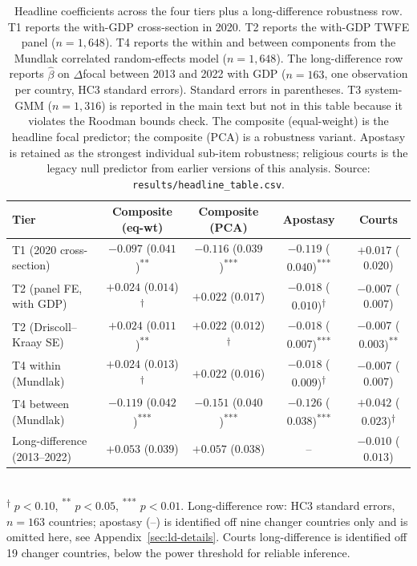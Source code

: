 \documentclass[12pt,a4paper]{article}
\begin{document}
\begin{table}[H]
\centering
\caption{Headline coefficients across the four tiers plus a long-difference robustness row. T1 reports the with-GDP cross-section in 2020. T2 reports the with-GDP TWFE panel ($n = 1{,}648$). T4 reports the within and between components from the Mundlak correlated random-effects model ($n = 1{,}648$). The long-difference row reports $\hat\beta$ on $\Delta$focal between 2013 and 2022 with GDP ($n = 163$, one observation per country, HC3 standard errors). Standard errors in parentheses. T3 system-GMM ($n = 1{,}316$) is reported in the main text but not in this table because it violates the Roodman bounds check. The composite (equal-weight) is the headline focal predictor; the composite (PCA) is a robustness variant. Apostasy is retained as the strongest individual sub-item robustness; religious courts is the legacy null predictor from earlier versions of this analysis. Source: \texttt{results/headline\_table.csv}.}
\label{tab:headline}
\begin{tabular}{lcccc}
\toprule
Tier & Composite (eq-wt) & Composite (PCA) & Apostasy & Courts \\
\midrule
T1 (2020 cross-section) & $-0.097$ ($0.041$)\textsuperscript{**} & $-0.116$ ($0.039$)\textsuperscript{***} & $-0.119$ ($0.040$)\textsuperscript{***} & $+0.017$ ($0.020$) \\
T2 (panel FE, with GDP) & $+0.024$ ($0.014$)\textsuperscript{$\dagger$} & $+0.022$ ($0.017$) & $-0.018$ ($0.010$)\textsuperscript{$\dagger$} & $-0.007$ ($0.007$) \\
T2 (Driscoll--Kraay SE) & $+0.024$ ($0.011$)\textsuperscript{**} & $+0.022$ ($0.012$)\textsuperscript{$\dagger$} & $-0.018$ ($0.007$)\textsuperscript{***} & $-0.007$ ($0.003$)\textsuperscript{**} \\
T4 within (Mundlak) & $+0.024$ ($0.013$)\textsuperscript{$\dagger$} & $+0.022$ ($0.016$) & $-0.018$ ($0.009$)\textsuperscript{$\dagger$} & $-0.007$ ($0.007$) \\
T4 between (Mundlak) & $-0.119$ ($0.042$)\textsuperscript{***} & $-0.151$ ($0.040$)\textsuperscript{***} & $-0.126$ ($0.038$)\textsuperscript{***} & $+0.042$ ($0.023$)\textsuperscript{$\dagger$} \\
\midrule
Long-difference (2013--2022) & $+0.053$ ($0.039$) & $+0.057$ ($0.038$) & -- & $-0.010$ ($0.013$) \\
\bottomrule
\end{tabular}
\smallskip
\\
{\footnotesize \textsuperscript{$\dagger$} $p < 0.10$, \textsuperscript{**} $p < 0.05$, \textsuperscript{***} $p < 0.01$. Long-difference row: HC3 standard errors, $n = 163$ countries; apostasy (--) is identified off nine changer countries only and is omitted here, see Appendix~\ref{sec:ld-details}. Courts long-difference is identified off 19 changer countries, below the power threshold for reliable inference.}
\end{table}
\end{document}
